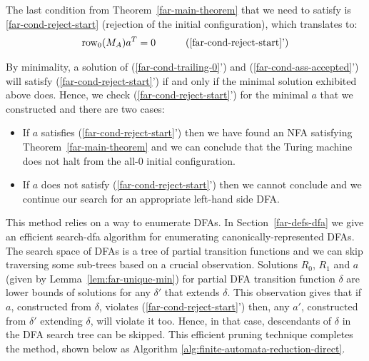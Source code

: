 The last condition from Theorem~\ref{far-main-theorem} that we need to satisfy is \eqref{far-cond-reject-start} (rejection of the initial configuration), which translates to:
\begin{align}
    \row_0 (M_A) a\T & =0
                     & \tag{\ref{far-cond-reject-start}'}
\end{align}

By minimality, a solution of (\ref{far-cond-trailing-0}') and (\ref{far-cond-ass-accepted}') will satisfy (\ref{far-cond-reject-start}') if and only if the minimal solution exhibited above does. Hence, we check (\ref{far-cond-reject-start}') for the minimal $a$ that we constructed and there are two cases:

\begin{itemize}
    \item If $a$ satisfies (\ref{far-cond-reject-start}') then we have found an NFA satisfying Theorem~\ref{far-main-theorem} and we can conclude that the Turing machine does not halt from the all-0 initial configuration.
    \item If $a$ does not satisfy (\ref{far-cond-reject-start}') then we cannot conclude and we continue our search for an appropriate left-hand side DFA.
\end{itemize}

This method relies on a way to enumerate DFAs. In Section~\ref{far-defs-dfa} we give an efficient {\sc search-dfa} algorithm for enumerating canonically-represented DFAs. The search space of DFAs is a tree of partial transition functions and we can skip traversing some sub-trees based on a crucial observation. Solutions $R_0$, $R_1$ and $a$ (given by Lemma~\ref{lem:far-unique-min}) for partial DFA transition function $\delta$ are lower bounds of solutions for any $\delta'$ that extends $\delta$. This observation gives that if $a$, constructed from $\delta$, violates (\ref{far-cond-reject-start}') then, any $a'$, constructed from $\delta'$ extending $\delta$, will violate it too. Hence, in that case, descendants of $\delta$ in the DFA search tree can be skipped.
This efficient pruning technique completes the method, shown below as Algorithm \ref{alg:finite-automata-reduction-direct}.

